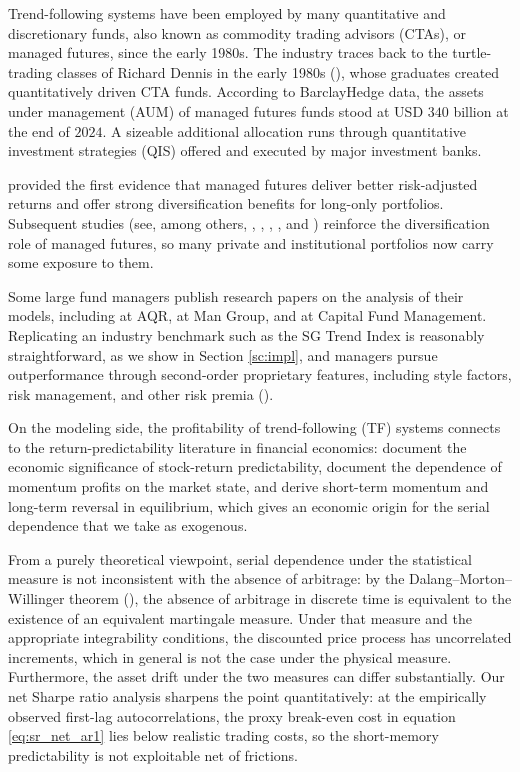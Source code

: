 \documentclass[hidelinks]{siamonline250211}
\begin{document}
Trend-following systems have been employed by many quantitative and discretionary funds, also known as commodity trading advisors (CTAs), or managed futures, since the early 1980s. The industry traces back to the turtle-trading classes of Richard Dennis in the early 1980s (\citealp{Angrist1989}), whose graduates created quantitatively driven CTA funds. According to BarclayHedge data, the assets under management (AUM) of managed futures funds stood at USD $340$ billion at the end of $2024$. A sizeable additional allocation runs through quantitative investment strategies (QIS) offered and executed by major investment banks.

\cite{Lintner1983} provided the first evidence that managed futures deliver better risk-adjusted returns and offer strong diversification benefits for long-only portfolios.
Subsequent studies (see, among others, \cite{Hamill2016}, \cite{Bouchaud2017}, \cite{Harvey2019}, \cite{Sepp2019}, and \cite{Sepp2020}) reinforce the diversification role of managed futures, so many private and institutional portfolios now carry some exposure to them.


Some large fund managers publish research papers on the analysis of their models, including \cite{Hurst2013} at AQR, \cite{Baz2015} at Man Group, and \cite{Bouchaud2017} at Capital Fund Management. Replicating an industry benchmark such as the SG Trend Index is reasonably straightforward, as we show in Section \ref{sc:impl}, and managers pursue outperformance through second-order proprietary features, including style factors, risk management, and other risk premia (\citealp{Carver2023}).

On the modeling side, the profitability of trend-following (TF) systems connects to the return-predictability literature in financial economics: \citet{PesaranTimmermann1995} document the economic significance of stock-return predictability, \citet{Cooper2004} document the dependence of momentum profits on the market state, and \citet{Bottazzi2019} derive short-term momentum and long-term reversal in equilibrium, which gives an economic origin for the serial dependence that we take as exogenous.


From a purely theoretical viewpoint, serial dependence under the statistical measure is not inconsistent with the absence of arbitrage: by the Dalang--Morton--Willinger theorem (\citealp{DalangMortonWillinger1990}), the absence of arbitrage in discrete time is equivalent to the existence of an equivalent martingale measure. Under that measure and the appropriate integrability conditions, the discounted price process has uncorrelated increments, which in general is not the case under the physical measure. Furthermore, the asset drift under the two measures can differ substantially.
Our net Sharpe ratio analysis sharpens the point quantitatively: at the empirically observed first-lag autocorrelations, the proxy break-even cost in equation \eqref{eq:sr_net_ar1} lies below realistic trading costs, so the short-memory predictability is not exploitable net of frictions.
\end{document}
